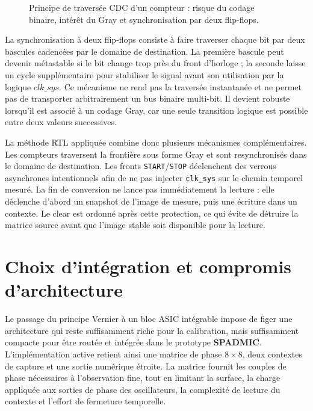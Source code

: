\begin{figure}[H]
{{%
    }}
    \caption{Principe de traversée CDC d'un compteur : risque du codage binaire, intérêt du Gray et synchronisation par deux flip-flops.}
    \label{fig:gray-cdc-principle}
\end{figure}

La synchronisation à deux flip-flops consiste à faire traverser chaque bit par deux bascules cadencées par le domaine de destination. La première bascule peut devenir métastable si le bit change trop près du front d'horloge ; la seconde laisse un cycle supplémentaire pour stabiliser le signal avant son utilisation par la logique \(clk\_sys\). Ce mécanisme ne rend pas la traversée instantanée et ne permet pas de transporter arbitrairement un bus binaire multi-bit. Il devient robuste lorsqu'il est associé à un codage Gray, car une seule transition logique est possible entre deux valeurs successives.

La méthode RTL appliquée combine donc plusieurs mécanismes complémentaires. Les compteurs traversent la frontière sous forme Gray et sont resynchronisés dans le domaine de destination. Les fronts \texttt{START}/\texttt{STOP} déclenchent des verrous asynchrones intentionnels afin de ne pas injecter \texttt{clk\_sys} sur le chemin temporel mesuré. La fin de conversion ne lance pas immédiatement la lecture : elle déclenche d'abord un snapshot de l'image de mesure, puis une écriture dans un contexte. Le clear est ordonné après cette protection, ce qui évite de détruire la matrice source avant que l'image stable soit disponible pour la lecture.

\section{Choix d'intégration et compromis d'architecture}

Le passage du principe Vernier à un bloc ASIC intégrable impose de figer une architecture qui reste suffisamment riche pour la calibration, mais suffisamment compacte pour être routée et intégrée dans le prototype \textbf{SPADMIC}. L'implémentation active retient ainsi une matrice de phase \mbox{$8\times8$}, deux contextes de capture et une sortie numérique étroite. La matrice fournit les couples de phase nécessaires à l'observation fine, tout en limitant la surface, la charge appliquée aux sorties de phase des oscillateurs, la complexité de lecture du contexte et l'effort de fermeture temporelle.

